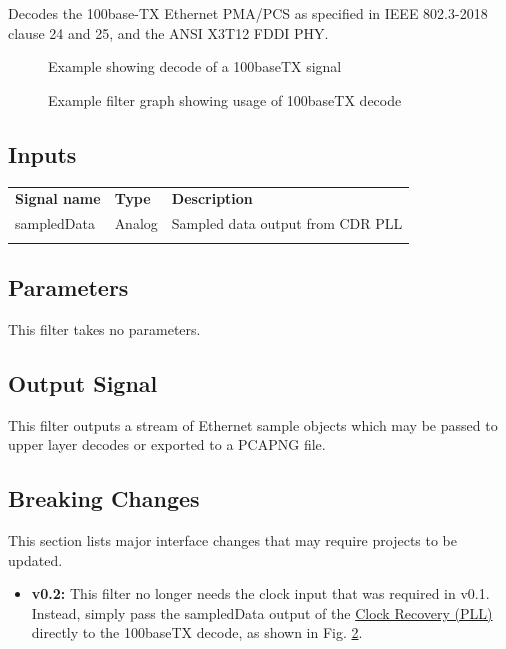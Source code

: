 Decodes the 100base-TX Ethernet PMA/PCS as specified in IEEE 802.3-2018 clause 24 and 25, and the ANSI X3T12 FDDI PHY.

\begin{figure}[h]
\centering
{}
\caption{Example showing decode of a 100baseTX signal}
\label{filter_100basetx}
\end{figure}

\begin{figure}[h]
\centering
{}
\caption{Example filter graph showing usage of 100baseTX decode}
\label{filter_graph_100basetx}
\end{figure}

\FloatBarrier
\subsection{Inputs}

\begin{tabularx}{16cm}{llX}
\thickhline
\textbf{Signal name} & \textbf{Type} & \textbf{Description} \\
\thickhline
sampledData & Analog & Sampled data output from CDR PLL\\
\thickhline
\end{tabularx}

\subsection{Parameters}

This filter takes no parameters.

\subsection{Output Signal}

This filter outputs a stream of Ethernet sample objects which may be passed to upper layer decodes or exported to a
PCAPNG file.

\subsection{Breaking Changes}

This section lists major interface changes that may require projects to be updated.

\begin{itemize}
\item \textbf{v0.2:} This filter no longer needs the clock input that was required in v0.1.
Instead, simply pass the sampledData output of the \hyperref[filter:cdrpll]{Clock Recovery (PLL)} directly to the
100baseTX decode, as shown in Fig. \ref{filter_graph_100basetx}.
\end{itemize}

